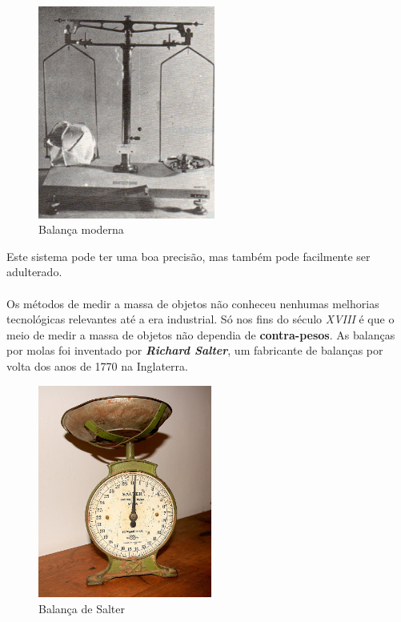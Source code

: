 \begin{minipage}[!b]{0.45\linewidth}
	\begin{figure}[H]
		\centering
		\includegraphics[height=7cm]{./image/PESTA/general/balanca_4.jpg}
		\caption{Balança moderna \cite{book_7}}
		\label{balanca_4}
	\end{figure}
\end{minipage}
\newline
\newline
\newline
Este sistema pode ter uma boa precisão, mas também pode facilmente ser adulterado.
\\
\\
Os métodos de medir a massa de objetos não conheceu nenhumas melhorias tecnológicas relevantes até a era industrial. Só nos fins do século \textit{XVIII} é que o meio de medir a massa de objetos não dependia de \textbf{contra-pesos}. As balanças por molas foi inventado por \textbf{\textit{Richard Salter}}, um fabricante de balanças por volta dos anos de 1770 na Inglaterra.\\
\begin{figure}[H]
	\centering
	\includegraphics[height=7cm]{./image/PESTA/general/Weigh_Scale_Salter_1.jpg}
	\caption{Balança de Salter}
	\label{Weigh_Scale_Salter_1}
\end{figure}
